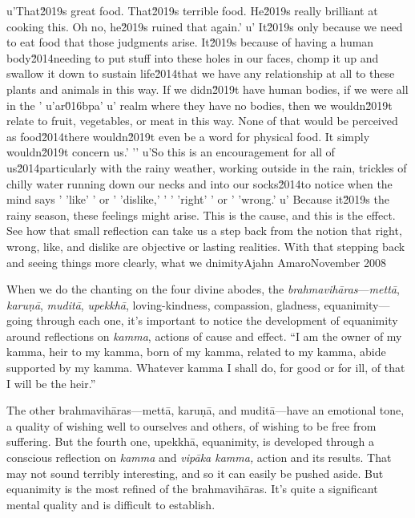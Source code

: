 {u'That\u2019s great food. That\u2019s terrible food. He\u2019s really brilliant at cooking this. Oh no, he\u2019s ruined that again.'
u' It\u2019s only because we need to eat food that those judgments arise. It\u2019s because of having a human body\u2014needing to put stuff into these holes in our faces, chomp it up and swallow it down to sustain life\u2014that we have any relationship at all to these plants and animals in this way. If we didn\u2019t have human bodies, if we were all in the '
u'ar\u016bpa'
u' realm where they have no bodies, then we wouldn\u2019t relate to fruit, vegetables, or meat in this way. None of that would be perceived as food\u2014there wouldn\u2019t even be a word for physical food. It simply wouldn\u2019t concern us.'
'\n'
u'So this is an encouragement for all of us\u2014particularly with the rainy weather, working outside in the rain, trickles of chilly water running down our necks and into our socks\u2014to notice when the mind says '
'like'
' or '
'dislike,'
' '
'right'
' or '
'wrong.'
u' Because it\u2019s the rainy season, these feelings might arise. This is the cause, and this is the effect. See how that small reflection can take us a step back from the notion that right, wrong, like, and dislike are objective or lasting realities. With that stepping back and seeing things more clearly, what we dnimity}{Ajahn Amaro}{November 2008}

When we do the chanting on the four divine abodes, the 
\emph{brahmavihāras}---\emph{mettā}, \emph{karuṇā}, 
\emph{muditā}, \emph{upekkhā}, loving-kindness, compassion, gladness, 
equanimity---going through each one, it's important to notice the 
development of equanimity around reflections on \emph{kamma}, actions 
of cause and effect. ``I am the owner of my kamma, heir to my kamma, 
born of my kamma, related to my kamma, abide supported by my kamma. 
Whatever kamma I shall do, for good or for ill, of that I will be the 
heir.''

The other brahmavihāras---mettā, karuṇā, and muditā---have an 
emotional tone, a quality of wishing well to ourselves and others, of 
wishing to be free from suffering. But the fourth one, upekkhā, 
equanimity, is developed through a conscious reflection on \emph{kamma} 
and \emph{vipāka kamma,} action and its results. That may not sound 
terribly interesting, and so it can easily be pushed aside. But 
equanimity is the most refined of the brahmavihāras. It's quite a 
significant mental quality and is difficult to establish.


